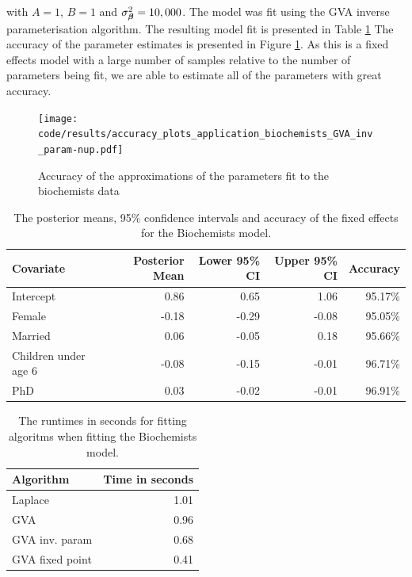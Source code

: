 			\noindent with $A=1$, $B=1$ and $\sigma_{\boldsymbol \beta}^2 = 10,000$. The model was fit using the GVA inverse parameterisation algorithm. The resulting model fit is presented in Table \ref{tab:biochemists_results}
			The accuracy of the parameter estimates is presented in Figure
			\ref{fig:biochemists}. As this is a fixed effects model with a large number of samples relative to the
			number of parameters being fit, we are able to estimate all of the parameters with great accuracy.

			\begin{figure}
			\texttt{[image: code/results/accuracy\_plots\_application\_biochemists\_GVA\_inv\_param-nup.pdf]}
			\label{fig:biochemists}
			\caption{Accuracy of the approximations of the parameters fit to the biochemists data}
			\end{figure}

			\begin{table}
				\begin{tabular}{|l|rrrr|}
					\hline
					Covariate          & Posterior Mean & Lower 95\% CI & Upper 95\% CI & Accuracy \\
					\hline
					Intercept & 0.86 & 0.65 & 1.06 &  95.17\% \\
					Female & -0.18 & -0.29 & -0.08 &  95.05\% \\
					Married & 0.06 & -0.05 & 0.18 & 95.66\% \\
					Children under age 6 & -0.08 & -0.15 & -0.01 & 96.71\% \\
					PhD & 0.03 & -0.02 & -0.01 & 96.91\% \\
					\hline
				\end{tabular}			
				\label{tab:biochemists_results}
				\caption{The posterior means, 95\% confidence intervals and accuracy of the fixed effects for the 
									Biochemists model.}
			\end{table}

			\begin{table}
				\begin{tabular}{|l|r|}
				\hline
				Algorithm & Time in seconds \\
				\hline
				Laplace & 1.01 \\
				GVA & 0.96 \\
				GVA inv. param & 0.68 \\
				GVA fixed point & 0.41 \\
				\hline
				\end{tabular}
				\label{tab:biochemists_runtime}
				\caption{The runtimes in seconds for fitting algoritms when fitting the Biochemists model.}
			\end{table}
			
